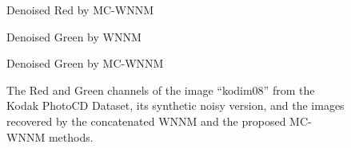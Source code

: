 \begin{figure}
{\begin{minipage}[t]{0.24\textwidth}
{\footnotesize Denoised Red by MC-WNNM}
\end{minipage}
\begin{minipage}[t]{0.24\textwidth}
\centering
{}
{\footnotesize Denoised Green by WNNM}
\end{minipage}
\begin{minipage}[t]{0.24\textwidth}
\centering
{}
{\footnotesize Denoised Green by MC-WNNM}
\end{minipage}
}
    \caption{The Red and Green channels of the image ``kodim08'' from the Kodak PhotoCD Dataset, its synthetic noisy version, and the images recovered by the concatenated WNNM and the proposed MC-WNNM methods.}
    \label{fig4-1}
\end{figure}

